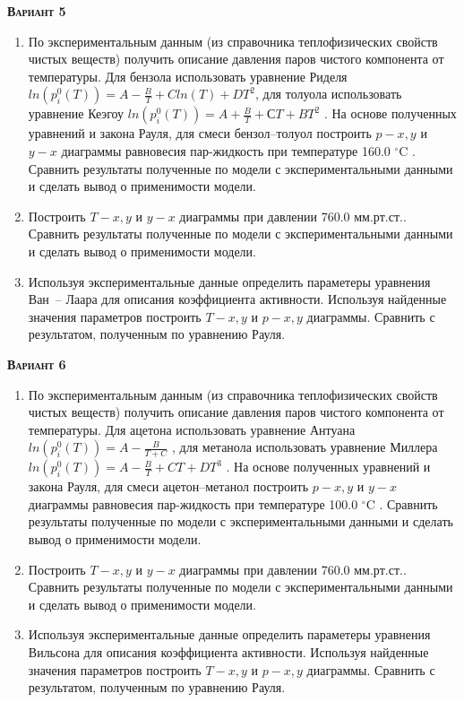 \textsc{\textbf{Вариант 5}}
\begin{enumerate}
\item По экспериментальным данным (из справочника теплофизических свойств чистых веществ) получить описание давления паров чистого компонента от температуры. Для бензола использовать уравнение Риделя $ln(p_i^0(T))=A-\frac{B}{T}+C ln(T)+DT^2$, для толуола использовать уравнение Кеэгоу $ln(p_i^0(T))=A+\frac{B}{T}+СT+BT^2$    . На основе полученных уравнений и закона Рауля, для смеси бензол--толуол построить $p-x,y$ и $y-x$ диаграммы равновесия пар-жидкость при температуре  160.0 $^\circ$C . Сравнить результаты полученные по модели с экспериментальными данными и сделать вывод о применимости модели.

\item Построить $T-x,y$ и $y-x$ диаграммы при давлении  760.0 мм.рт.ст.. Сравнить результаты полученные по модели с экспериментальными данными и сделать вывод о применимости модели. \item Используя экспериментальные данные определить параметеры уравнения Ван~-- Лаара для описания коэффициента активности. Используя найденные значения параметров построить $T-x,y$ и $p-x,y$ диаграммы. Сравнить с результатом, полученным по уравнению Рауля.\end{enumerate}

\textsc{\textbf{Вариант 6}}
\begin{enumerate}
\item По экспериментальным данным (из справочника теплофизических свойств чистых веществ) получить описание давления паров чистого компонента от температуры. Для ацетона использовать уравнение Антуана $ln(p_i^0(T))=A-\frac{B}{T+C}$         , для метанола использовать уравнение Миллера $ln(p_i^0(T))=A-\frac{B}{T}+C T+DT^3$  . На основе полученных уравнений и закона Рауля, для смеси ацетон--метанол построить $p-x,y$ и $y-x$ диаграммы равновесия пар-жидкость при температуре  100.0 $^\circ$C . Сравнить результаты полученные по модели с экспериментальными данными и сделать вывод о применимости модели.

\item Построить $T-x,y$ и $y-x$ диаграммы при давлении  760.0 мм.рт.ст.. Сравнить результаты полученные по модели с экспериментальными данными и сделать вывод о применимости модели. \item Используя экспериментальные данные определить параметеры уравнения Вильсона     для описания коэффициента активности. Используя найденные значения параметров построить $T-x,y$ и $p-x,y$ диаграммы. Сравнить с результатом, полученным по уравнению Рауля.\end{enumerate}

